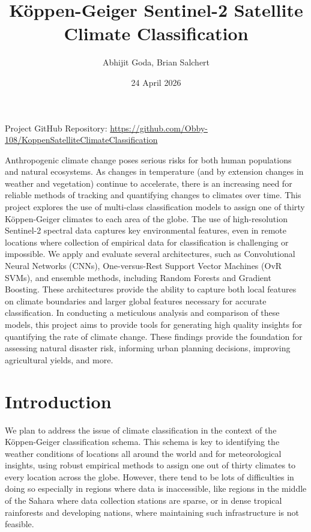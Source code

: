 \documentclass[12pt]{article}
\title{Köppen-Geiger Sentinel-2 Satellite Climate Classification}
\author{Abhijit Goda, Brian Salchert}
\date{24 April 2026}
\begin{document}
\maketitle

\centering
Project GitHub Repository: \url{https://github.com/Obby-108/KoppenSatelliteClimateClassification}

\abstract

Anthropogenic climate change poses serious risks for both human populations and natural ecosystems.
As changes in temperature (and by extension changes in weather and vegetation) continue to accelerate, there is an increasing need for reliable methods of tracking and quantifying changes to climates over time.
This project explores the use of multi-class classification models to assign one of thirty Köppen-Geiger climates to each area of the globe.
The use of high-resolution Sentinel-2 spectral data captures key environmental features, even in remote locations where collection of empirical data for classification is challenging or impossible.
We apply and evaluate several architectures, such as Convolutional Neural Networks (CNNs), One-versus-Rest Support Vector Machines (OvR SVMs), and ensemble methods, including Random Forests and Gradient Boosting.
These architectures provide the ability to capture both local features on climate boundaries and larger global features necessary for accurate classification.
In conducting a meticulous analysis and comparison of these models, this project aims to provide tools for generating high quality insights for quantifying the rate of climate change.
These findings provide the foundation for assessing natural disaster risk, informing urban planning decisions, improving agricultural yields, and more.

\section{Introduction}
\label{sec:introduction}

\indent We plan to address the issue of climate classification in the context of the Köppen-Geiger classification schema.
This schema is key to identifying the weather conditions of locations all around the world and for meteorological insights, using robust empirical methods to assign one out of thirty climates to every location across the globe.
However, there tend to be lots of difficulties in doing so especially in regions where data is inaccessible, like regions in the middle of the Sahara where data collection stations are sparse, or in dense tropical rainforests and developing nations, where maintaining such infrastructure is not feasible.
\end{document}
